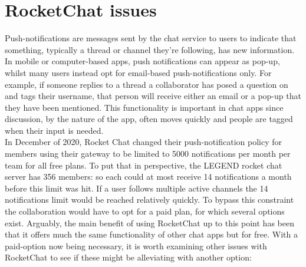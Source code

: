 \documentclass[11pt,letterpaper]{article}
\begin{document}
\section{RocketChat issues}
Push-notifications are messages sent by the chat service to users to indicate that something, typically a thread or channel they're following, has new information. In mobile or computer-based apps, push notifications can appear as pop-up, whilst many users instead opt for email-based push-notifications only. For example, if someone replies to a thread a collaborator has posed a question on and tags their username, that person will receive either an email or a pop-up that they have been mentioned. This functionality is important in chat apps since discussion, by the nature of the app, often moves quickly and people are tagged when their input is needed.\\
 In December of 2020, Rocket Chat changed their push-notification policy for members using their gateway to be limited to 5000 notifications per month per team for all free plans. To put that in perspective, the LEGEND rocket chat server has 356 members: so each could at most receive 14 notifications a month before this limit was hit. If a user follows multiple active channels the 14 notifications limit would be reached relatively quickly. To bypass this constraint the collaboration would have to opt for a paid plan, for which several options exist. 
Arguably, the main benefit of using RocketChat up to this point has been that it offers much the same functionality of other chat apps but for free. With a paid-option now being necessary, it is worth examining other issues with RocketChat to see if these might be alleviating with another option:
\end{document}
